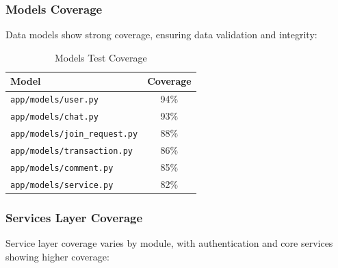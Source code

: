 \documentclass[12pt,a4paper]{report}
\begin{document}
\subsubsection{Models Coverage}

Data models show strong coverage, ensuring data validation and integrity:

\begin{table}[h]
    \centering
    \begin{tabular}{|l|c|}
        \hline
        \textbf{Model}                       & \textbf{Coverage} \\
        \hline
        \texttt{app/models/user.py}          & 94\%              \\
        \hline
        \texttt{app/models/chat.py}          & 93\%              \\
        \hline
        \texttt{app/models/join\_request.py} & 88\%              \\
        \hline
        \texttt{app/models/transaction.py}   & 86\%              \\
        \hline
        \texttt{app/models/comment.py}       & 85\%              \\
        \hline
        \texttt{app/models/service.py}       & 82\%              \\
        \hline
    \end{tabular}
    \caption{Models Test Coverage}
\end{table}

\subsubsection{Services Layer Coverage}

Service layer coverage varies by module, with authentication and core services showing higher coverage:
\end{document}
